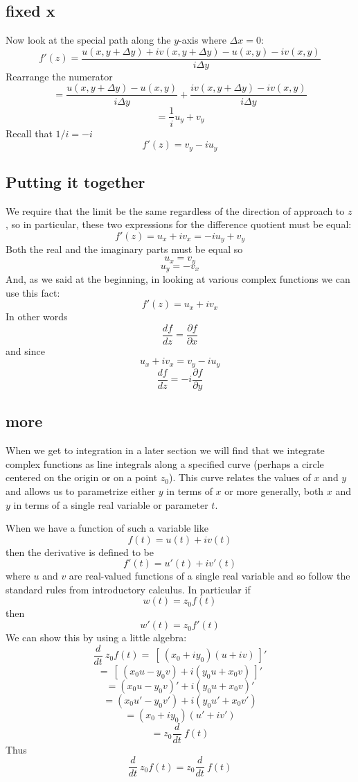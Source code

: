 \documentclass[11pt, oneside]{article}   	%
\begin{document}
\subsection*{fixed x}
Now look at the special path along the $y$-axis where $\Delta x = 0$:
\[ f'(z) = \frac{u(x, y + \Delta y) + i v (x, y + \Delta y) - u(x,y) - i v(x,y)}{i \Delta y} \]
Rearrange the numerator
\[ = \frac{u(x, y + \Delta y) - u(x,y)}{i \Delta y} + \frac{i v (x, y + \Delta y) - i v(x,y)}{i \Delta y} \]
\[ = \frac{1}{i} u_y + v_y \]
Recall that $1/i = -i$
\[ f'(z) = v_y - i u_y \]

\subsection*{Putting it together}
We require that the limit be the same regardless of the direction of approach to $z$, so in particular, these two expressions for the difference quotient must be equal:
\[ f'(z) = u_x + i v_x = - i u_y + v_y \]
Both the real and the imaginary parts must be equal so
\[ u_x  = v_y \]
\[ u_y = - v_x \]
And, as we said at the beginning, in looking at various complex functions we can use this fact:
\[ f'(z) = u_x + i v_x \]
In other words
\[ \frac{df}{dz} = \frac{\partial f}{\partial x} \]
and since
\[ u_x + i v_x = v_y - i u_y \]
\[ \frac{df}{dz} = -i \frac{\partial f}{\partial y} \]

\subsection*{more}
When we get to integration in a later section we will find that we integrate complex functions as line integrals along a specified curve (perhaps a circle centered on the origin or on a point $z_0$).  This curve relates the values of $x$ and $y$ and allows us to parametrize either $y$ in terms of $x$ or more generally, both $x$ and $y$ in terms of a single real variable or parameter $t$.

When we have a function of such a variable like
\[ f(t) = u(t) + i v(t) \]
then the derivative is defined to be
\[ f'(t) = u'(t) + i v'(t) \]
where $u$ and $v$ are real-valued functions of a single real variable and so follow the standard rules from introductory calculus.  In particular if
\[ w(t) = z_0 f(t) \]
then
\[ w'(t) = z_0 f'(t) \]
We can show this by using a little algebra:
\[ \frac{d}{dt} \ z_0 f(t) = \ [ \ (x_0 + i y_0) (u + iv) \ ]' \]
\[ = \ [ \ (x_0 u - y_0 v) + i (y_0 u + x_0 v) \ ]' \]
\[ = (x_0 u - y_0 v)' + i (y_0 u + x_0 v)' \]
\[ = (x_0 u' - y_0 v') + i (y_0 u' + x_0 v') \]
\[ = (x_0 + i y_0)(u' + iv') \]
\[ = z_0 \frac{d}{dt} \ f(t) \]
Thus
\[ \frac{d}{dt} \ z_0 f(t) = z_0 \frac{d}{dt} \ f(t) \]
\end{document}
